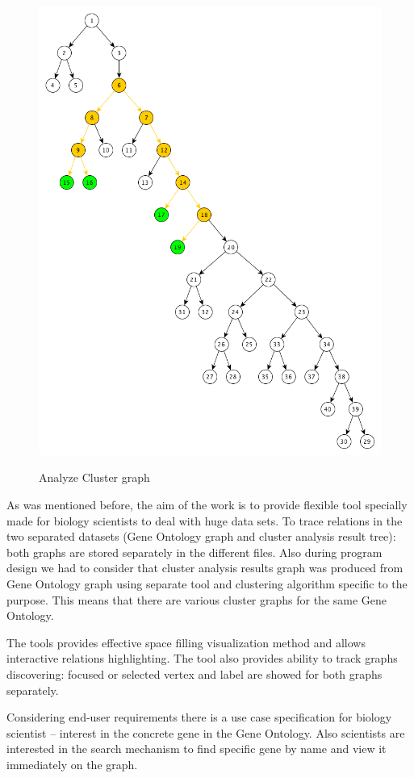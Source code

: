 \begin{figure}[h!]
{    \includegraphics[scale=0.23]{pictures/subgraph_extraction_algorithm_step_5.png}
}
\caption{Analyze Cluster graph}
\end{figure}


As was mentioned before, the aim of the work is to provide flexible tool specially made for biology scientists to deal with huge data sets.
To trace relations in the two separated datasets (Gene Ontology graph and cluster analysis result tree): both graphs are stored separately in the different files.
Also during program design we had to consider that cluster analysis results graph was produced from Gene Ontology graph using separate tool and clustering algorithm specific to the purpose.
This means that there are various cluster graphs for the same Gene Ontology.

The tools provides effective space filling visualization method and allows interactive relations highlighting.
The tool also provides ability to track graphs discovering: focused or selected vertex and label are showed for both graphs separately.

Considering end-user requirements there is a use case specification for biology scientist --
interest in the concrete gene in the Gene Ontology. Also scientists are interested in the search mechanism to find specific gene by name and view it immediately on the graph.